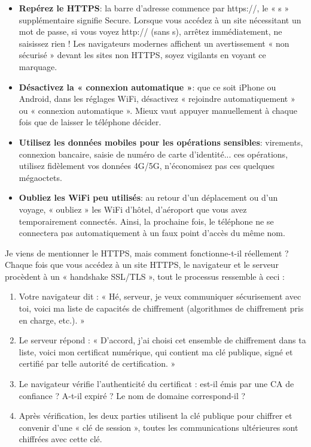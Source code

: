 \begin{itemize}
  \item \textbf{Repérez le HTTPS}: la barre d'adresse commence par https://, le « s » supplémentaire signifie Secure. Lorsque vous accédez à un site nécessitant un mot de passe, si vous voyez http:// (sans s), arrêtez immédiatement, ne saisissez rien ! Les navigateurs modernes affichent un avertissement « non sécurisé » devant les sites non HTTPS, soyez vigilants en voyant ce marquage.
  \item \textbf{Désactivez la « connexion automatique »}: que ce soit iPhone ou Android, dans les réglages WiFi, désactivez « rejoindre automatiquement » ou « connexion automatique ». Mieux vaut appuyer manuellement à chaque fois que de laisser le téléphone décider.
  \item \textbf{Utilisez les données mobiles pour les opérations sensibles}: virements, connexion bancaire, saisie de numéro de carte d'identité... ces opérations, utilisez fidèlement vos données 4G/5G, n'économisez pas ces quelques mégaoctets.
  \item \textbf{Oubliez les WiFi peu utilisés}: au retour d'un déplacement ou d'un voyage, « oubliez » les WiFi d'hôtel, d'aéroport que vous avez temporairement connectés. Ainsi, la prochaine fois, le téléphone ne se connectera pas automatiquement à un faux point d'accès du même nom.
\end{itemize}


Je viens de mentionner le HTTPS, mais comment fonctionne-t-il réellement ? Chaque fois que vous accédez à un site HTTPS, le navigateur et le serveur procèdent à un « handshake SSL/TLS », tout le processus ressemble à ceci :

\begin{enumerate}
  \item Votre navigateur dit : « Hé, serveur, je veux communiquer sécurisement avec toi, voici ma liste de capacités de chiffrement (algorithmes de chiffrement pris en charge, etc.). »
  \item Le serveur répond : « D'accord, j'ai choisi cet ensemble de chiffrement dans ta liste, voici mon certificat numérique, qui contient ma clé publique, signé et certifié par telle autorité de certification. »
  \item Le navigateur vérifie l'authenticité du certificat : est-il émis par une CA de confiance ? A-t-il expiré ? Le nom de domaine correspond-il ?
  \item Après vérification, les deux parties utilisent la clé publique pour chiffrer et convenir d'une « clé de session », toutes les communications ultérieures sont chiffrées avec cette clé.
\end{enumerate}

